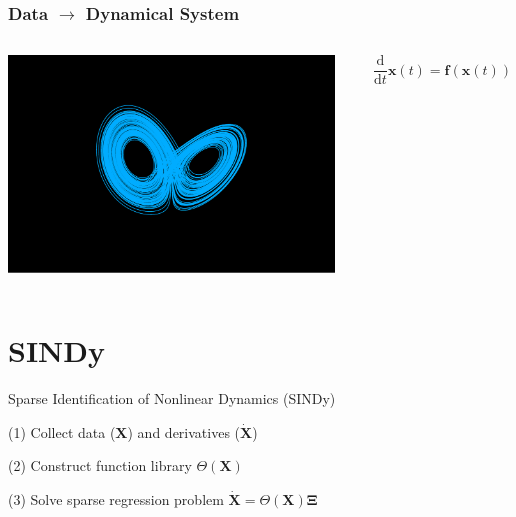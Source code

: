 \documentclass[aspectratio=169]{beamer}
\begin{document}
\begin{frame}
\frametitle{Data $\to$ Dynamical System}
\begin{columns}
	\begin{center}
		\includegraphics[width=0.95\textwidth, trim={4cm, 1.5cm, 4cm, 3cm}, clip]{Examples/slide3_lorenz_attractor.pdf}
	\end{center}

	\[ \frac{\mathrm d}{\mathrm dt} \mathbf x(t) = \mathbf f(\mathbf x(t)) \]
\end{columns}

\end{frame}



\section{SINDy}

\begin{frame}{Sparse Identification of Nonlinear Dynamics (SINDy)}

\begin{vfilleditems}
	\item[(1)] Collect data ($\mathbf X$) and derivatives ($\mathbf {\dot X}$)
	\item[(2)] Construct function library $\Theta(\mathbf X)$
	\item[(3)] Solve sparse regression problem $\mathbf {\dot X} = \Theta(\mathbf X) \mathbf \Xi$
\end{vfilleditems}
\end{frame}
\end{document}
